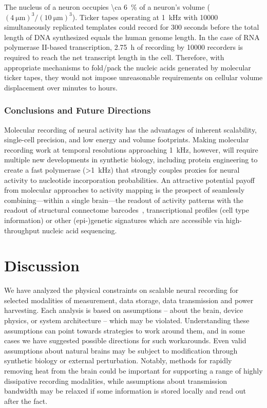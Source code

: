 The nucleus of a neuron occupies \SI{\ca 6}{\percent} of a neuron's volume ($(\SI{4}{\um})^3/(\SI{10}{\um})^3$).
Ticker tapes operating at \SI{1}{\kHz} with \num{10000} simultaneously replicated templates could record for \num{300} seconds before the total length of DNA synthesized equals the human genome length.
In the case of RNA polymerase II-based transcription, \SI{2.75}{\hour} of recording by \num{10000} recorders is required to reach the net transcript length in the cell.
Therefore, with appropriate mechanisms to fold/pack the nucleic acids generated by molecular ticker tapes, they would not impose unreasonable requirements on cellular volume displacement over minutes to hours.

\subsubsection{Conclusions and Future Directions}

Molecular recording of neural activity has the advantages of inherent scalability, single-cell precision, and low energy and volume footprints.
Making molecular recording work at temporal resolutions approaching \SI{1}{\kHz}, however, will require multiple new developments in synthetic biology, including protein engineering to create a fast polymerase (\SI{>1}{\kHz}) that strongly couples proxies for neural activity to nucleotide incorporation probabilities.
An attractive potential payoff from molecular approaches to activity mapping is the prospect of seamlessly combining---within a single brain---the readout of activity patterns with the readout of structural connectome barcodes~\cite{zador12}, transcriptional profiles (cell type information) or other (epi-)genetic signatures which are accessible via high-throughput nucleic acid sequencing.

\section{Discussion}

We have analyzed the physical constraints on scalable neural recording for selected modalities of measurement, data storage, data transmission and power harvesting.
Each analysis is based on assumptions -- about the brain, device physics, or system architecture -- which may be violated.
Understanding these assumptions can point towards strategies to work around them, and in some cases we have suggested possible directions for such workarounds.
Even valid assumptions about natural brains may be subject to modification through synthetic biology or external perturbation.
Notably, methods for rapidly removing heat from the brain could be important for supporting a range of highly dissipative recording modalities, while assumptions about transmission bandwidth may be relaxed if some information is stored locally and read out after the fact.

